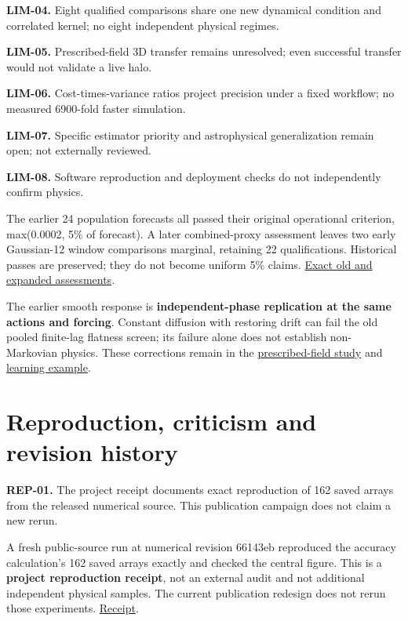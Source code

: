 \documentclass[fleqn,usenatbib]{mnras}
\begin{document}
\textbf{LIM-04.} Eight qualified comparisons share one new dynamical condition and correlated kernel; no eight independent physical regimes.

\textbf{LIM-05.} Prescribed-field 3D transfer remains unresolved; even successful transfer would not validate a live halo.

\textbf{LIM-06.} Cost-times-variance ratios project precision under a fixed workflow; no measured 6900-fold faster simulation.

\textbf{LIM-07.} Specific estimator priority and astrophysical generalization remain open; not externally reviewed.

\textbf{LIM-08.} Software reproduction and deployment checks do not independently confirm physics.

The earlier 24 population forecasts all passed their original operational criterion, max(0.0002, 5\% of forecast). A later combined-proxy assessment leaves two early Gaussian-12 window comparisons marginal, retaining 22 qualifications. Historical passes are preserved; they do not become uniform 5\% claims. \href{https://djova.ca/galaxy-bar/diagnostics/population-accuracy/joint-error-assessment.json}{Exact old and expanded assessments}.

The earlier smooth response is \textbf{independent-phase replication at the same actions and forcing}. Constant diffusion with restoring drift can fail the old pooled finite-lag flatness screen; its failure alone does not establish non-Markovian physics. These corrections remain in the \href{https://djova.ca/galaxy-bar/response.html}{prescribed-field study} and \href{https://djova.ca/galaxy-bar/learn.html\#learn-5}{learning example}.

\section{Reproduction, criticism and revision history}\label{reproduction}

\textbf{REP-01.} The project receipt documents exact reproduction of 162 saved arrays from the released numerical source. This publication campaign does not claim a new rerun.

A fresh public-source run at numerical revision 66143eb reproduced the accuracy calculation's 162 saved arrays exactly and checked the central figure. This is a \textbf{project reproduction receipt}, not an external audit and not additional independent physical samples. The current publication redesign does not rerun those experiments. \href{https://djova.ca/galaxy-bar/diagnostics/population-accuracy/accuracy-reproduction.json}{Receipt}.
\end{document}
